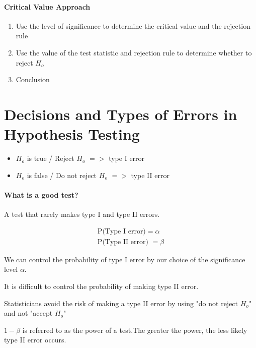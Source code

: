 \documentclass{article}
\begin{document}
        \paragraph*{Critical Value Approach}
        \begin{enumerate}
            \item Use the level of significance to determine the 
                    critical value and the rejection rule
            \item Use the value of the test statistic and rejection rule to determine whether to reject $H_{o}$
            \item Conclusion
        \end{enumerate}

        \section*{Decisions and Types of Errors in Hypothesis Testing}
        \begin{itemize}
            \item $H_{o}$ is true / Reject $H_{o}$ $=>$ type I error
            \item $H_{o}$ is false / Do not reject $H_{o}$ $=>$ type II error
        \end{itemize}

        \paragraph*{What is a good test?\newline}
        A test that rarely makes type I and type II errors.

        \begin{align*}
            \text{P(Type I error)} = \alpha \\
            \text{P(Type II error) }= \beta
        \end{align*}

        We can control the probability of type I error by our choice of the significance level $\alpha$.\par

        It is difficult to control the probability of making type II error.\par

        Statisticians avoid the risk of making a type II error by using "do not reject $H_{o}$" 
        and not "accept $H_{o}$"\par

        $1-\beta$  is referred to as the power of a test.The greater the power, 
        the less likely type II error occurs.\par
\end{document}
